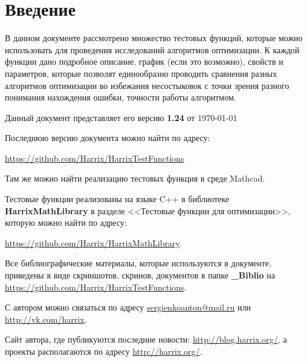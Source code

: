 \chapter*{Введение}

В данном документе рассмотрено множество тестовых функций, которые можно использовать для проведения исследований алгоритмов оптимизации. К каждой функции дано подробное описание, график (если это возможно), свойств и параметров, которые позволят единообразно проводить сравнения разных алгоритмов оптимизации во избежания несостыковок с точки зрения разного понимания нахождения ошибки, точности работы алгоритмом.

Данный документ представляет его версию \textbf{1.24} от \today

Последнюю версию документа можно найти по адресу:

\href{https://github.com/Harrix/HarrixTestFunctions}{https://github.com/Harrix/HarrixTestFunctions}

Там же можно найти реализацию тестовых функция в среде Mathcad.

Тестовые функции реализованы на языке C++ в библиотеке  \textbf{HarrixMathLibrary} в разделе <<Тестовые функции для оптимизации>>, которую можно найти по адресу:

\href{https://github.com/Harrix/HarrixMathLibrary} {https://github.com/Harrix/HarrixMathLibrary}.

Все библиографические материалы, которые используются в документе, приведены в виде скриншотов, скринов, документов в папке \textbf{\_Biblio} на \href{https://github.com/Harrix/HarrixTestFunctions}{https://github.com/Harrix/HarrixTestFunctions}.

С автором можно связаться по адресу \href{mailto:sergienkoanton@mail.ru}{sergienkoanton@mail.ru} или  \href{http://vk.com/harrix}{http://vk.com/harrix}.

Сайт автора, где публикуются последние новости: \href{http://blog.harrix.org/}{http://blog.harrix.org/}, а проекты располагаются по адресу \href{http://harrix.org/}{http://harrix.org/}.


\clearpage
